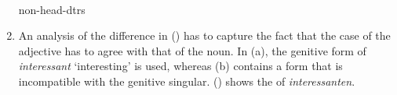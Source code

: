 \begin{enumerate}
{{{                       } \\
      non-head-dtrs  \\
}}
\label{avm-max-lacht}
\item An analysis of the difference in () has to capture the fact that the case of the adjective has to agree with that of the noun. In (a),
the genitive form of \emph{interessant} `interesting' is used, whereas (b) contains a form that is incompatible with the genitive singular.
\eal
{}
\zl
() shows the \catv of \emph{interessanten}.


\end{enumerate}
